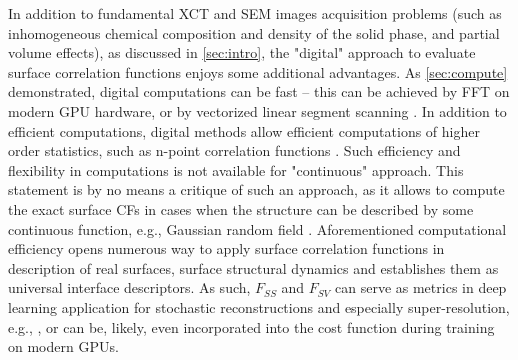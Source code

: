 \documentclass[reprint,amsmath,amssymb,aps,pre,showkeys,showpacs]{revtex4-1}
\begin{document}
In addition to fundamental XCT and SEM images acquisition problems (such as
inhomogeneous chemical composition and density of the solid phase, and partial
volume effects), as discussed in \cref{sec:intro}, the "digital" approach to
evaluate surface correlation functions enjoys some additional advantages. As
\cref{sec:compute} demonstrated, digital computations can be fast -- this can be
achieved by FFT on modern GPU hardware, or by vectorized linear segment scanning
\cite{EPL1}. In addition to efficient computations, digital methods allow
efficient computations of higher order statistics, such as n-point correlation
functions \cite{malmir2018}. Such efficiency and flexibility in computations is
not available for "continuous" approach. This statement is by no means a
critique of such an approach, as it allows to compute the exact surface CFs in
cases when the structure can be described by some continuous function, e.g.,
Gaussian random field \cite{ma2018SS}. Aforementioned computational efficiency
opens numerous way to apply surface correlation functions in description of real
surfaces, surface structural dynamics and establishes them as universal
interface descriptors. As such, $F_{SS}$ and $F_{SV}$ can serve as metrics in
deep learning application for stochastic reconstructions and especially
super-resolution, e.g., \cite{chen2020super,janssens2020,karimpouli2022}, or can
be, likely, even incorporated into the cost function during training on modern
GPUs.
\end{document}
